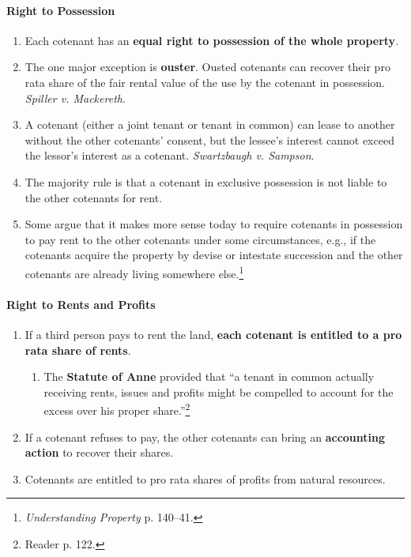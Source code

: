 \paragraph{Right to Possession}

\begin{enumerate}
    \item Each cotenant has an \textbf{equal right to possession of the whole 
    property}.
    \item The one major exception is \textbf{ouster}. Ousted cotenants can 
    recover their pro rata share of the fair rental value of the use by the 
    cotenant in possession. \emph{Spiller v. Mackereth}.
    \item A cotenant (either a joint tenant or tenant in common)  can lease to 
    another without the other cotenants' consent, but the lessee's interest 
    cannot exceed the lessor's interest as a cotenant.  \emph{Swartzbaugh v. 
    Sampson}.
    \item The majority rule is that a cotenant in exclusive possession is not 
    liable to the other cotenants for rent.
    \item Some argue that it makes more sense today to require cotenants in 
    possession to pay rent to the other cotenants under some circumstances, 
    e.g., if the cotenants acquire the property by devise or intestate 
    succession and the other cotenants are already living somewhere 
    else.\footnote{\emph{Understanding Property} p. 140--41.}
\end{enumerate}

\paragraph{Right to Rents and Profits}

\begin{enumerate}
    \item If a third person pays to rent the land, \textbf{each cotenant is 
    entitled to a pro rata share of rents}.
    \begin{enumerate}
        \item The \textbf{Statute of Anne} provided that ``a tenant in common 
        actually receiving rents, issues and profits might be compelled to 
        account for the excess over his proper share.''\footnote{Reader p. 
        122.}
    \end{enumerate}
    \item If a cotenant refuses to pay, the other cotenants can bring an 
    \textbf{accounting action} to recover their shares.
    \item Cotenants are entitled to pro rata shares of profits from natural 
    resources.
\end{enumerate}


